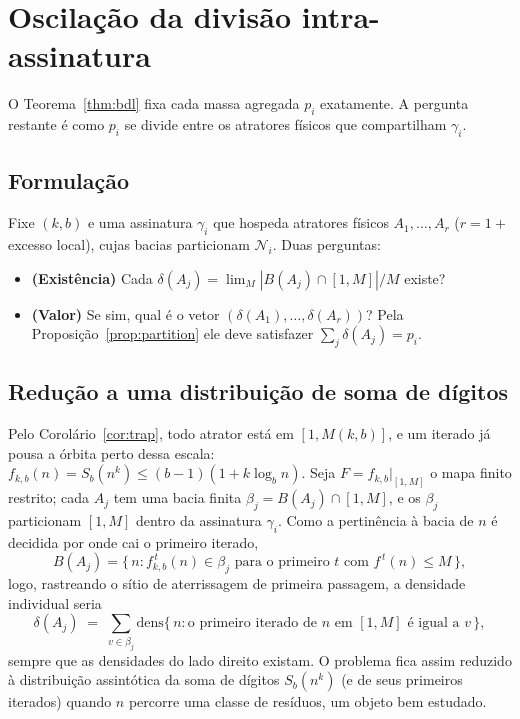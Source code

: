 \documentclass[11pt]{article}
\theoremstyle{definition}
\theoremstyle{remark}
\newcommand{\dens}{\mathrm{dens}}
\begin{document}
\section{Oscilação da divisão intra-assinatura}\label{sec:split}

O Teorema~\ref{thm:bdl} fixa cada massa agregada $p_i$ exatamente. A pergunta restante é como $p_i$ se divide entre os atratores físicos que compartilham $\gamma_i$.

\subsection{Formulação}

Fixe $(k,b)$ e uma assinatura $\gamma_i$ que hospeda atratores físicos $A_1,\dots,A_r$ ($r = 1 + {}$excesso local), cujas bacias particionam $\mathcal{N}_i$. Duas perguntas:
\begin{itemize}
\item \textbf{(Existência)} Cada $\delta(A_j) = \lim_M |B(A_j) \cap [1,M]|/M$ existe?
\item \textbf{(Valor)} Se sim, qual é o vetor $(\delta(A_1),\dots,\delta(A_r))$? Pela Proposição~\ref{prop:partition} ele deve satisfazer $\sum_j \delta(A_j) = p_i$.
\end{itemize}

\subsection{Redução a uma distribuição de soma de dígitos}

Pelo Corolário~\ref{cor:trap}, todo atrator está em $[1,M(k,b)]$, e um iterado já pousa a órbita perto dessa escala: $f_{k,b}(n) = S_b(n^k) \le (b-1)(1 + k \log_b n)$. Seja $F = f_{k,b}\big|_{[1,M]}$ o mapa finito restrito; cada $A_j$ tem uma bacia finita $\beta_j = B(A_j) \cap [1,M]$, e os $\beta_j$ particionam $[1,M]$ dentro da assinatura $\gamma_i$. Como a pertinência à bacia de $n$ é decidida por onde cai o primeiro iterado,
\[
B(A_j) = \{\, n : f_{k,b}^{\,t}(n) \in \beta_j \text{ para o primeiro } t \text{ com } f^{\,t}(n) \le M \,\},
\]
logo, rastreando o sítio de aterrissagem de primeira passagem, a densidade individual seria
\[
\delta(A_j) \;=\; \sum_{v \in \beta_j} \dens\big\{\, n : \text{o primeiro iterado de } n \text{ em } [1,M] \text{ é igual a } v \,\big\},
\]
sempre que as densidades do lado direito existam. O problema fica assim reduzido à distribuição assintótica da soma de dígitos $S_b(n^k)$ (e de seus primeiros iterados) quando $n$ percorre uma classe de resíduos, um objeto bem estudado.
\end{document}
